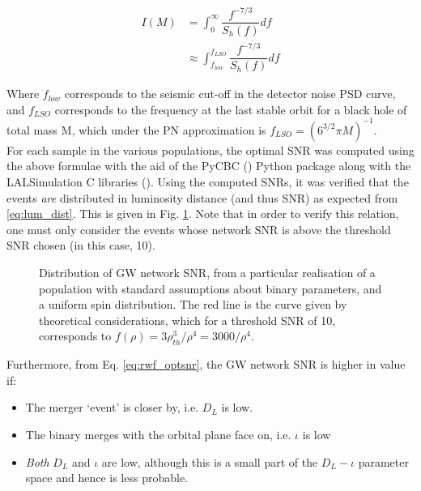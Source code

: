         \begin{align}
            I(M) &= \int_0^\infty \dfrac{f^{-7/3}}{S_h(f)} df \\
                 &\approx \int_{f_{low}}^{f_{LSO}} \dfrac{f^{-7/3}}{S_h(f)} df
            \label{eq:freq_integral}
        \end{align}

        Where $f_{low}$ corresponds to the seismic cut-off in the detector noise PSD
        curve, and $f_{LSO}$ corresponds to the frequency at the last stable orbit for a
        black hole of total mass M, which under the PN approximation is $f_{LSO} =
        (6^{3/2} \pi M)^{-1}$.\\
        For each sample in the various populations, the optimal SNR was computed using
        the above formulae with the aid of the PyCBC (\cite{pycbc}) Python package along
        with the LALSimulation C libraries (\cite{lalsuite}). Using the computed SNRs,
        it was verified that the events \textit{are} distributed in luminosity distance
        (and thus SNR) as expected from \ref{eq:lum_dist}. This is given in
        Fig. \ref{fig:rho_dist}. Note that in order to verify this relation, one must
        only consider the events whose network SNR is above the threshold SNR chosen (in
        this case, 10).\\

        \begin{figure}[H]
            \centering
            \def\svgwidth{0.8\linewidth}
            
            \caption[Distribution of GW network SNR]
            {
                Distribution of GW network SNR, from a particular realisation of a
                population with standard assumptions about binary parameters, and a
                uniform spin distribution. The red line is the curve given by
                theoretical considerations, which for a threshold SNR of 10, corresponds
                to $f(\rho) = 3\rho_{th}^3 / \rho^4 = 3000 / \rho^4$.
            }
            \label{fig:rho_dist}
        \end{figure}


        Furthermore, from Eq. \ref{eq:rwf_optsnr}, the GW network SNR is higher in value
        if:

        \begin{itemize}

            \item The merger `event' is closer by, i.e. $D_L$ is low.

            \item The binary merges with the orbital plane face on, i.e. $\iota$ is low

            \item \emph{Both} $D_L$ and $\iota$ are low, although this is a small part
                of the $D_L-\iota$ parameter space and hence is less probable.

        \end{itemize}

